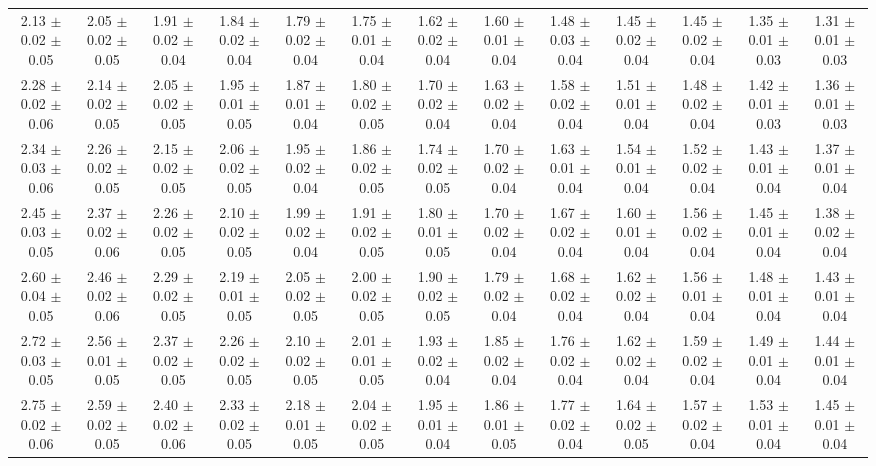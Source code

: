 \begin{landscape}
{\begin{tabular}{  | c | c | c | c | c | c | c | c | c | c | c | c | c | }
2.13 $\pm$0.02 $\pm$0.05 & 2.05 $\pm$0.02 $\pm$0.05 & 1.91 $\pm$0.02 $\pm$0.04 & 1.84 $\pm$0.02 $\pm$0.04 & 1.79 $\pm$0.02 $\pm$0.04 & 1.75 $\pm$0.01 $\pm$0.04 & 1.62 $\pm$0.02 $\pm$0.04 & 1.60 $\pm$0.01 $\pm$0.04 & 1.48 $\pm$0.03 $\pm$0.04 & 1.45 $\pm$0.02 $\pm$0.04 & 1.45 $\pm$0.02 $\pm$0.04 & 1.35 $\pm$0.01 $\pm$0.03 & 1.31 $\pm$0.01 $\pm$0.03\\
2.28 $\pm$0.02 $\pm$0.06 & 2.14 $\pm$0.02 $\pm$0.05 & 2.05 $\pm$0.02 $\pm$0.05 & 1.95 $\pm$0.01 $\pm$0.05 & 1.87 $\pm$0.01 $\pm$0.04 & 1.80 $\pm$0.02 $\pm$0.05 & 1.70 $\pm$0.02 $\pm$0.04 & 1.63 $\pm$0.02 $\pm$0.04 & 1.58 $\pm$0.02 $\pm$0.04 & 1.51 $\pm$0.01 $\pm$0.04 & 1.48 $\pm$0.02 $\pm$0.04 & 1.42 $\pm$0.01 $\pm$0.03 & 1.36 $\pm$0.01 $\pm$0.03\\
2.34 $\pm$0.03 $\pm$0.06 & 2.26 $\pm$0.02 $\pm$0.05 & 2.15 $\pm$0.02 $\pm$0.05 & 2.06 $\pm$0.02 $\pm$0.05 & 1.95 $\pm$0.02 $\pm$0.04 & 1.86 $\pm$0.02 $\pm$0.05 & 1.74 $\pm$0.02 $\pm$0.05 & 1.70 $\pm$0.02 $\pm$0.04 & 1.63 $\pm$0.01 $\pm$0.04 & 1.54 $\pm$0.01 $\pm$0.04 & 1.52 $\pm$0.02 $\pm$0.04 & 1.43 $\pm$0.01 $\pm$0.04 & 1.37 $\pm$0.01 $\pm$0.04\\
2.45 $\pm$0.03 $\pm$0.05 & 2.37 $\pm$0.02 $\pm$0.06 & 2.26 $\pm$0.02 $\pm$0.05 & 2.10 $\pm$0.02 $\pm$0.05 & 1.99 $\pm$0.02 $\pm$0.04 & 1.91 $\pm$0.02 $\pm$0.05 & 1.80 $\pm$0.01 $\pm$0.05 & 1.70 $\pm$0.02 $\pm$0.04 & 1.67 $\pm$0.02 $\pm$0.04 & 1.60 $\pm$0.01 $\pm$0.04 & 1.56 $\pm$0.02 $\pm$0.04 & 1.45 $\pm$0.01 $\pm$0.04 & 1.38 $\pm$0.02 $\pm$0.04\\
2.60 $\pm$0.04 $\pm$0.05 & 2.46 $\pm$0.02 $\pm$0.06 & 2.29 $\pm$0.02 $\pm$0.05 & 2.19 $\pm$0.01 $\pm$0.05 & 2.05 $\pm$0.02 $\pm$0.05 & 2.00 $\pm$0.02 $\pm$0.05 & 1.90 $\pm$0.02 $\pm$0.05 & 1.79 $\pm$0.02 $\pm$0.04 & 1.68 $\pm$0.02 $\pm$0.04 & 1.62 $\pm$0.02 $\pm$0.04 & 1.56 $\pm$0.01 $\pm$0.04 & 1.48 $\pm$0.01 $\pm$0.04 & 1.43 $\pm$0.01 $\pm$0.04\\
2.72 $\pm$0.03 $\pm$0.05 & 2.56 $\pm$0.01 $\pm$0.05 & 2.37 $\pm$0.02 $\pm$0.05 & 2.26 $\pm$0.02 $\pm$0.05 & 2.10 $\pm$0.02 $\pm$0.05 & 2.01 $\pm$0.01 $\pm$0.05 & 1.93 $\pm$0.02 $\pm$0.04 & 1.85 $\pm$0.02 $\pm$0.04 & 1.76 $\pm$0.02 $\pm$0.04 & 1.62 $\pm$0.02 $\pm$0.04 & 1.59 $\pm$0.02 $\pm$0.04 & 1.49 $\pm$0.01 $\pm$0.04 & 1.44 $\pm$0.01 $\pm$0.04\\
2.75 $\pm$0.02 $\pm$0.06 & 2.59 $\pm$0.02 $\pm$0.05 & 2.40 $\pm$0.02 $\pm$0.06 & 2.33 $\pm$0.02 $\pm$0.05 & 2.18 $\pm$0.01 $\pm$0.05 & 2.04 $\pm$0.02 $\pm$0.05 & 1.95 $\pm$0.01 $\pm$0.04 & 1.86 $\pm$0.01 $\pm$0.05 & 1.77 $\pm$0.02 $\pm$0.04 & 1.64 $\pm$0.02 $\pm$0.05 & 1.57 $\pm$0.02 $\pm$0.04 & 1.53 $\pm$0.01 $\pm$0.04 & 1.45 $\pm$0.01 $\pm$0.04\\

\end{tabular}}
\end{landscape}
